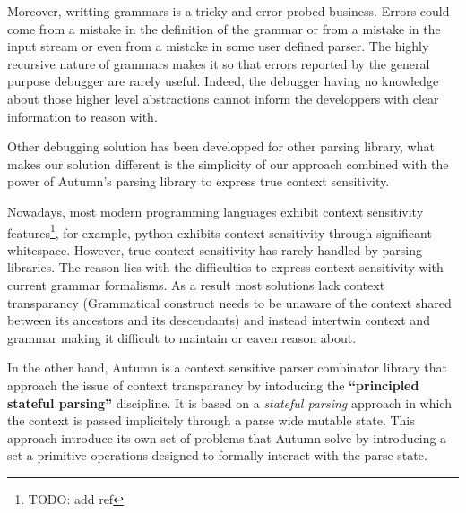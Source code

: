 Moreover, writting grammars is a tricky and error probed business. Errors could come from a mistake in the definition of the grammar or from a mistake in the input stream or even from a mistake in some user defined parser. The highly recursive nature of grammars makes it so that errors reported by the general purpose debugger are rarely useful. Indeed, the debugger having no knowledge about those higher level abstractions cannot inform the developpers with clear information to reason with.


\bigskip

Other debugging solution has been developped for other parsing library, what makes our solution different is the simplicity of our approach combined with the power of Autumn's parsing library to express true context sensitivity.

\bigskip

Nowadays, most modern programming languages exhibit context sensitivity features\footnote{TODO: add ref}, for example, python exhibits context sensitivity through significant whitespace. However, true context-sensitivity has rarely handled by parsing libraries. The reason lies with the difficulties to express context sensitivity with current grammar formalisms. As a result most solutions lack context transparancy (Grammatical construct needs to be unaware of the context shared between its ancestors and its descendants) and instead intertwin context and grammar making it difficult to maintain or eaven reason about.

\bigskip

In the other hand, Autumn is a context sensitive parser combinator library that approach the issue of context transparancy by intoducing the \textbf{``principled stateful parsing''} discipline. It is based on a \textit{stateful parsing} approach in which the context is passed implicitely through a parse wide mutable state. This approach introduce its own set of problems that Autumn solve by introducing a set a primitive operations designed to formally interact with the parse state.

